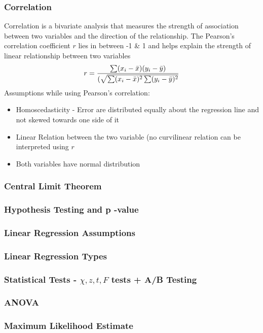 \documentclass[12pt]{article}
\begin{document}
\subsubsection{Correlation}
Correlation is a bivariate analysis that measures the strength of association between two variables and the direction of the relationship.
The Pearson's correlation coefficient $r$ lies in between -1 \& 1 and helps explain the strength of linear relationship between two variables\newline 
\begin{equation*}
    r = \frac{\sum(x_i - \Bar{x})(y_i - \Bar{y})}{(\sqrt{\sum(x_i - \Bar{x})^{2}\sum(y_i - \Bar{y})^{2}}}
\end{equation*}
Assumptions while using Pearson's correlation:
\begin{itemize}
    \item Homoscedasticity - Error are distributed equally about the regression line and not skewed towards one side of it
    \item Linear Relation between the two variable (no curvilinear relation can be interpreted using $r$
    \item Both variables have normal distribution
\end{itemize}
\subsubsection{Central Limit Theorem}
\subsubsection{Hypothesis Testing and p -value}
\subsubsection{Linear Regression Assumptions}
\subsubsection{Linear Regression Types}
\subsubsection{Statistical Tests - $\chi, z, t, F$ tests + A/B Testing} 
\subsubsection{ANOVA}

\subsubsection{Maximum Likelihood Estimate}
\end{document}
